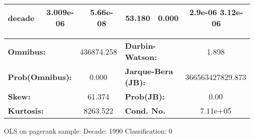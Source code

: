 \begin{center}
\begin{tabular}{lccccc}
\textbf{decade}             &    3.009e-06  &     5.66e-08     &    53.180  &         0.000        &       2.9e-06  3.12e-06       \\
\bottomrule
\end{tabular}
\begin{tabular}{lclc}
\textbf{Omnibus:}       & 436874.258 & \textbf{  Durbin-Watson:     } &        1.898      \\
\textbf{Prob(Omnibus):} &    0.000   & \textbf{  Jarque-Bera (JB):  } & 366563427829.873  \\
\textbf{Skew:}          &   61.374   & \textbf{  Prob(JB):          } &         0.00      \\
\textbf{Kurtosis:}      &  8263.522  & \textbf{  Cond. No.          } &     7.11e+05      \\
\bottomrule
\end{tabular}
\end{center}
\break
OLS on pagerank sample: Decade: 1990 Classification: 0
